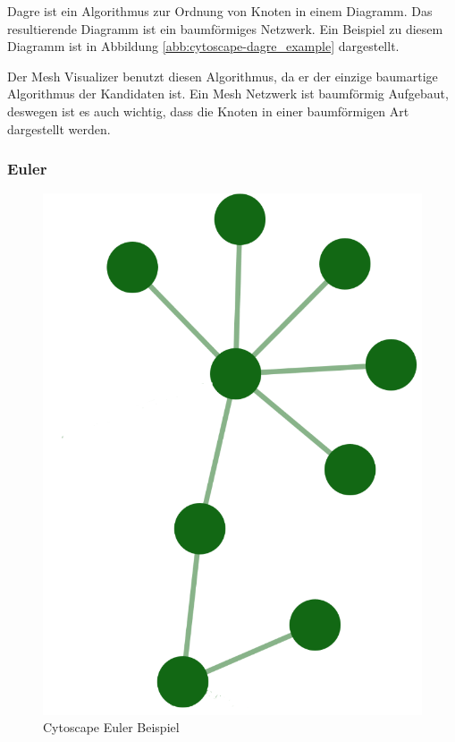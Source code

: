 Dagre ist ein Algorithmus zur Ordnung von Knoten in einem Diagramm. Das resultierende Diagramm ist ein baumförmiges Netzwerk.
Ein Beispiel zu diesem Diagramm ist in Abbildung \ref{abb:cytoscape-dagre_example} dargestellt.

Der Mesh Visualizer benutzt diesen Algorithmus, da er der einzige baumartige Algorithmus der Kandidaten ist. Ein Mesh Netzwerk ist baumförmig Aufgebaut, deswegen ist es auch wichtig, dass die Knoten in einer baumförmigen Art dargestellt werden.

\subsubsection{Euler}\label{sec:cytoscape-euler}

\begin{figure}[H] 
    \begin{center}
        \includegraphics[scale=0.5]{images/cytoscape-euler-example.png}
        \caption{Cytoscape Euler Beispiel \cite{cytoscape_euler}}
        \label{abb:cytoscape-spread-example}
    \end{center}    
\end{figure}

